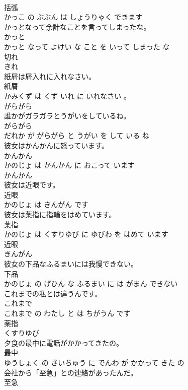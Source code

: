 \documentclass[8pt]{extreport}
\begin{document}
\begin{CJK}{UTF8}{min}
\\	括弧 
\\	かっこ の ぶぶん は しょうりゃく できます			
\\	かっとなって余計なことを言ってしまったな。	
\\	かっと 
\\	かっと なって よけい な こと を いって しまった な			
\\	切れ	
\\	きれ		
\\	紙屑は屑入れに入れなさい。	
\\	紙屑 
\\	かみくず は くず いれ に いれなさい 。			
\\	がらがら	
\\	誰かがガラガラとうがいをしているね。	
\\	がらがら 
\\	だれか が がらがら と うがい を して いる ね			
\\	彼女はかんかんに怒っています。	
\\	かんかん 
\\	かのじょ は かんかん に おこって います			
\\	かんかん	
\\	彼女は近眼です。	
\\	近眼 
\\	かのじょ は きんがん です			
\\	彼女は薬指に指輪をはめています。	
\\	薬指 
\\	かのじょ は くすりゆび に ゆびわ を はめて います			
\\	近眼	
\\	きんがん		
\\	彼女の下品なふるまいには我慢できない。	
\\	下品 
\\	かのじょ の げひん な ふるまい に は がまん できない			
\\	これまでの私とは違うんです。	
\\	これまで 
\\	これまで の わたし と は ちがうん です			
\\	薬指	
\\	くすりゆび		
\\	夕食の最中に電話がかかってきたの。	
\\	最中 
\\	ゆうしょく の さいちゅう に でんわ が かかって きた の			
\\	会社から「至急」との連絡があったんだ。	
\\	至急 

\end{CJK}
\end{document}
